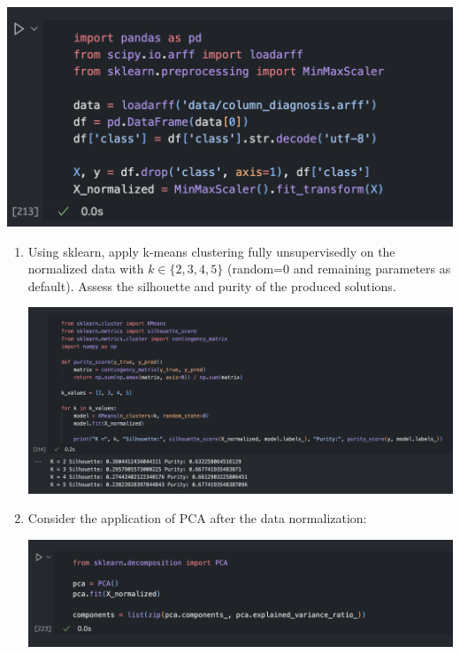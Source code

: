 \documentclass[12pt]{article}
\begin{document}
\begin{center}
    \includegraphics[scale=0.5]{images/code6.png}
\end{center}

\begin{enumerate}
    \item Using sklearn, apply k-means clustering fully unsupervisedly on the normalized data with
    $k \in \{2,3,4,5\}$ (random=0 and remaining parameters as default). Assess the silhouette and purity of
    the produced solutions.

    \begin{center}
        \includegraphics[scale=0.38]{images/code7.png}
    \end{center}

    \item Consider the application of PCA after the data normalization:
    
    \begin{center}
        \includegraphics[scale=0.5]{images/code8.png}
    \end{center}


\end{enumerate}
\end{document}

